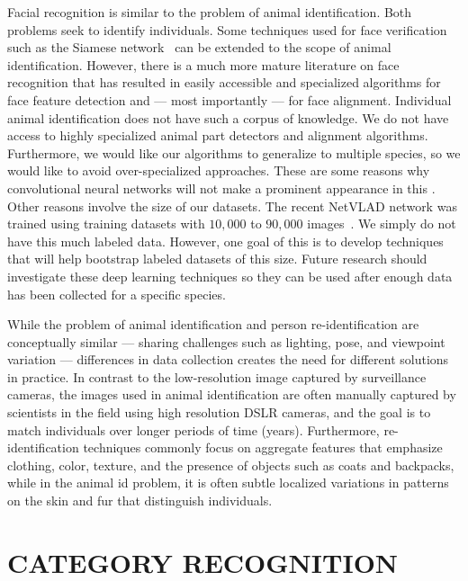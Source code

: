         Facial recognition is similar to the problem of animal identification.
        Both problems seek to identify individuals. Some techniques used for face verification such as the Siamese
        network~\cite{chopra_learning_2005, taigman_deepface_2014} can be extended to the scope of animal
        identification. However, there is a much more mature literature on face recognition that has resulted in
        easily accessible and specialized algorithms for face feature detection and --- most importantly --- for
        face alignment. Individual animal identification does not have such a corpus of knowledge. We do not have
        access to highly specialized animal part detectors and alignment algorithms. Furthermore, we would like our
        algorithms to generalize to multiple species, so we would like to avoid over-specialized approaches. These
        are some reasons why convolutional neural networks will not make a prominent appearance in this \thesis{}.
        Other reasons involve the size of our datasets. The recent NetVLAD network was trained using training
        datasets with $10,000$ to $90,000$ images~\cite{arandjelovic_netvlad_2016}. We simply do not have this much
        labeled data. However, one goal of this \thesis{} is to develop techniques that will help bootstrap labeled
        datasets of this size. Future research should investigate these deep learning techniques so they can be
        used after enough data has been collected for a specific species.

        While the problem of animal identification and person re-identification are conceptually similar ---
        sharing challenges such as lighting, pose, and viewpoint variation --- differences in data collection
        creates the need for different solutions in practice. In contrast to the low-resolution image captured by
        surveillance cameras, the images used in animal identification are often manually captured by scientists in
        the field using high resolution DSLR cameras, and the goal is to match individuals over longer periods of
        time (years). Furthermore, re-identification techniques commonly focus on aggregate features that emphasize
        clothing, color, texture, and the presence of objects such as coats and backpacks, while in the animal id
        problem, it is often subtle localized variations in patterns on the skin and fur that distinguish
        individuals.


\section{CATEGORY RECOGNITION}\label{sec:cr}  

